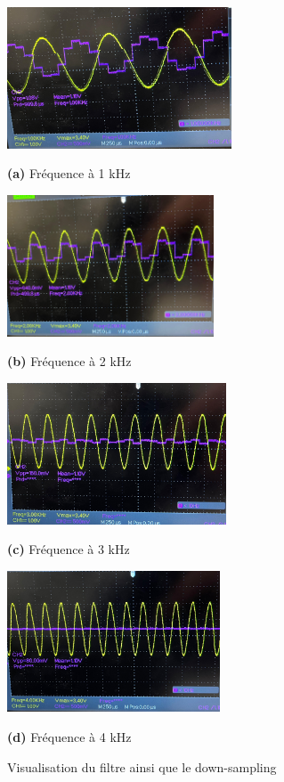 \documentclass[a4paper,11pt]{article}
\begin{document}
{\captionsetup{skip=0pt}
\begin{figure}[H]
\centering
\begin{minipage}[t]{0.45\textwidth}
\centering
\includegraphics[height=4.2cm]{images/1khz.png}
\caption*{\textbf{(a)} Fréquence à 1 kHz}\label{fig:freq1}
\end{minipage}
\hspace{0.5cm}
\begin{minipage}[t]{0.45\textwidth}
\includegraphics[height=4.2cm]{images/2khz.png}
\caption*{\textbf{(b)} Fréquence à 2 kHz} \label{fig:freq2}
\end{minipage}
\vspace{0.2cm}
\centering
\vspace{0.2cm}
\begin{minipage}[t]{0.45\textwidth}
\centering
\includegraphics[height=4.2cm]{images/3khz.png}
\caption*{\textbf{(c)} Fréquence à 3 kHz}\label{fig:freq3}
\end{minipage}
\hspace{0.5cm}
\begin{minipage}[t]{0.45\textwidth}
\includegraphics[height=4.2cm]{images/4khz.png}
\caption*{\textbf{(d)} Fréquence à 4 kHz} \label{fig:freq4}
\end{minipage}
\vspace{0.2cm}
\caption{Visualisation du filtre ainsi que le down-sampling} \label{fig:filtre}
\vspace{0.2cm}
\end{figure}
}
\end{document}
